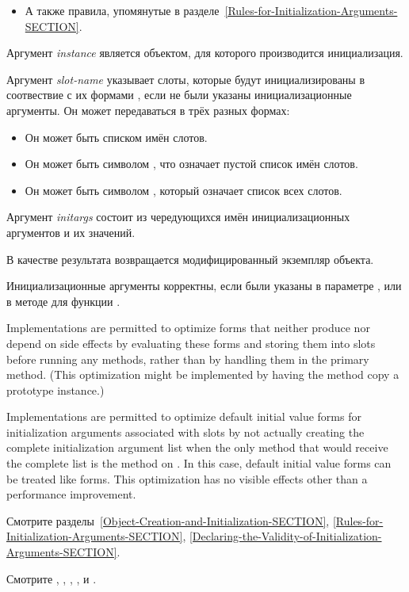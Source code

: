 \begin{defun}
\begin{itemize}
\item А также правила, упомянутые в разделе~\ref{Rules-for-Initialization-Arguments-SECTION}.
\end{itemize}

Аргумент \emph{instance} является объектом, для которого производится инициализация.

Аргумент \emph{slot-name} указывает слоты, которые будут инициализированы в
соотвествие с их формами , если не были указаны инициализационные
аргументы. Он может передаваться в трёх разных формах:

\begin{itemize}

\item Он может быть списком имён слотов.

\item Он может быть символом , что означает пустой список имён слотов.

\item Он может быть символом , который означает список всех слотов.
\end{itemize}

Аргумент \emph{initargs} состоит из чередующихся имён инициализационных
аргументов и их значений.

В качестве результата возвращается модифицированный экземпляр объекта.

Инициализационные аргументы корректны, если были указаны в параметре
 , или в методе для функции . 

Implementations are permitted to optimize  forms that 
neither produce nor depend on side effects by evaluating these forms
and storing them into slots before running any 
 methods, rather than by handling them in the
primary  method.  (This optimization might
be implemented by having the  method copy a
prototype instance.)

Implementations are permitted to optimize default initial value forms
for initialization arguments associated with slots by not actually
creating the complete initialization argument list when the only method
that would receive the complete list is the method on 
.  In this case, default initial value forms can be 
treated like  forms.  This optimization has no visible
effects other than a performance improvement.

Смотрите разделы~\ref{Object-Creation-and-Initialization-SECTION},
\ref{Rules-for-Initialization-Arguments-SECTION},
\ref{Declaring-the-Validity-of-Initialization-Arguments-SECTION}.

Смотрите ,
,
,
,
 и .
\end{defun}



